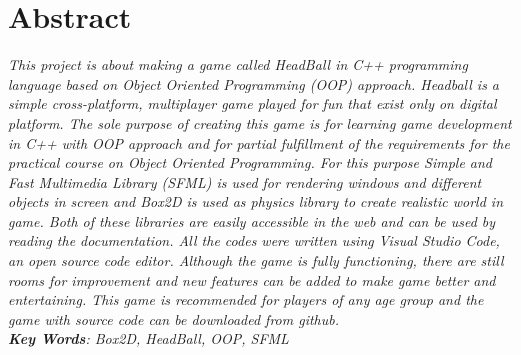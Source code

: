 \documentclass[main]{subfiles}
\begin{document}
	\chapter*{\centering Abstract}
\textit{
This project is about making a game called HeadBall in C++ programming language based on Object Oriented Programming (OOP) approach. Headball is a simple cross-platform, multiplayer game played for fun that exist only on digital platform. The sole purpose of creating this game is for learning game development in C++ with OOP approach and for partial fulfillment of the requirements for the practical course on Object Oriented Programming. For this purpose  Simple and Fast Multimedia Library (SFML) is used for rendering windows and different objects in screen and Box2D is used as physics library to create realistic world in game. Both of these libraries are easily accessible in the web and can be used by reading the documentation. All the codes were written using Visual Studio Code, an open source code editor.   
Although the game is fully functioning, there  are still rooms for improvement and new features can be added to make game better and entertaining. This game is recommended for players of any age group and the game with source code can be downloaded from github. \\
\textbf{Key Words}: Box2D, HeadBall, OOP, SFML 
}
\end{document}
